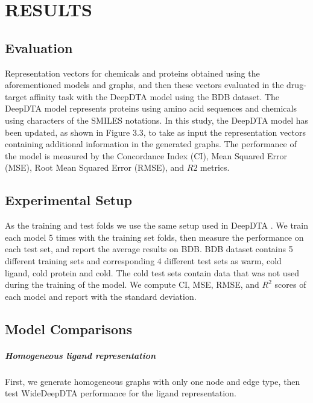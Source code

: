 \chapter{RESULTS}

\section{Evaluation}
Representation vectors for chemicals and proteins obtained using the aforementioned models and graphs, and then these vectors evaluated in the drug-target affinity task with the DeepDTA model using the BDB dataset. The DeepDTA model represents proteins using amino acid sequences and chemicals using characters of the SMILES notations. In this study, the DeepDTA model has been updated, as shown in Figure 3.3, to take as input the representation vectors containing additional information in the generated graphs. The performance of the model is measured by the Concordance Index (CI),  Mean Squared Error (MSE), Root Mean Squared Error (RMSE), and $R2$ metrics. 


\section{Experimental Setup}

As the training and test folds we use the same setup used in DeepDTA \cite{ozturk2018deepdta}. We train each model 5 times with the training set folds, then measure the performance on each test set, and report the average results on BDB. BDB dataset contains 5 different training sets and corresponding 4 different test sets as warm, cold ligand, cold protein and cold. The cold test sets contain data that was not used during the training of the model. We compute CI, MSE, RMSE, and $R^2$ scores of each model and report with the standard deviation.


\section{Model Comparisons}

\paragraph{Homogeneous ligand representation}
First, we generate homogeneous graphs with only one node and edge type, then test WideDeepDTA performance for the ligand representation.

